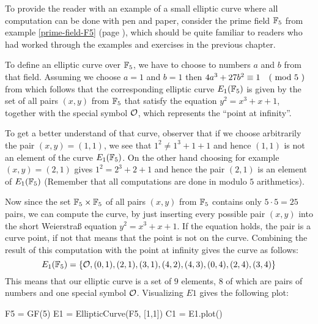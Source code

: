 \begin{example}\label{E1F5}To provide the reader with an example of a small elliptic curve where all computation can be done with pen and paper, consider the prime field $\mathbb{F}_5$ from example \ref{prime-field-F5} (page \pageref{prime-field-F5}), which should be  quite familiar  to readers who had worked through the examples and exercises in the previous chapter.

To define an elliptic curve over $\mathbb{F}_5$, we have to choose to numbers $a$ and $b$ from that field. Assuming we choose $a=1$ and $b=1$ then $4a^3+ 27b^2 \equiv 1 \quad \text{( mod } 5 \text{ )}$ from which follows that the corresponding elliptic curve $E_1(\mathbb{F}_5)$ is given by the set of all pairs $(x,y)$ from $\mathbb{F}_5$ that satisfy the equation $y^2=x^3+x+1$, together with the special symbol $\mathcal{O}$, which represents the ``point at infinity''. 

To get a better understand of that curve, observer that if we choose arbitrarily the pair $(x,y)=(1,1)$, we see that $1^2 \neq 1^3+1 + 1$ and hence $(1,1)$ is not an element of the curve $E_1(\mathbb{F}_5)$. On the other hand choosing for example $(x,y)=(2,1)$ gives $1^2 = 2^3 + 2 + 1$ and hence the pair $(2,1)$ is an element of $E_1(\mathbb{F}_5)$ (Remember that all computations are done in modulo $5$ arithmetics).

Now since the set $\mathbb{F}_5\times \mathbb{F}_5$ of all pairs $(x,y)$ from $\mathbb{F}_5$ contains only $5\cdot 5=25$ pairs, we can compute the curve, by just inserting every possible pair $(x,y)$ into the short Weierstraß equation $y^2 = x^3 + x +1$. If the equation holds, the pair is a curve point, if not that means that the point is not on the curve. Combining the result of this computation with the point at infinity gives the curve as follows:
$$
E_1(\mathbb{F}_5) = \{\mathcal{O}, (0,1),(2,1),(3,1),(4,2),(4,3),(0,4),(2,4),(3,4)\}
$$
This means that our elliptic curve is a set of $9$ elements, $8$ of which are pairs of numbers and one special symbol $\mathcal{O}$. Visualizing $E1$ gives the following plot:
\begin{sagesilent}
F5 = GF(5)
E1 = EllipticCurve(F5, [1,1])
C1 = E1.plot()
\end{sagesilent}
\begin{center} 
\end{center}
\end{example}
